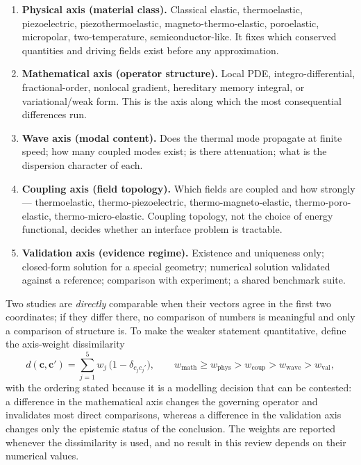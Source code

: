 \begin{enumerate}[label=\textbf{Axis \arabic*:}]
\item \textbf{Physical axis (material class).} Classical elastic, thermoelastic, piezoelectric,
  piezothermoelastic, magneto-thermo-elastic, poroelastic, micropolar, two-temperature, semiconductor-like.
  It fixes which conserved quantities and driving fields exist before any approximation.
\item \textbf{Mathematical axis (operator structure).} Local PDE, integro-differential, fractional-order,
  nonlocal gradient, hereditary memory integral, or variational/weak form. This is the axis along which the
  most consequential differences run.
\item \textbf{Wave axis (modal content).} Does the thermal mode propagate at finite speed; how many coupled
  modes exist; is there attenuation; what is the dispersion character of each.
\item \textbf{Coupling axis (field topology).} Which fields are coupled and how strongly ---
  thermoelastic, thermo-piezoelectric, thermo-magneto-elastic, thermo-poro-elastic, thermo-micro-elastic.
  Coupling topology, not the choice of energy functional, decides whether an interface problem is tractable.
\item \textbf{Validation axis (evidence regime).} Existence and uniqueness only; closed-form solution for a
  special geometry; numerical solution validated against a reference; comparison with experiment; a shared
  benchmark suite.
\end{enumerate}

Two studies are \emph{directly} comparable when their vectors agree in the first two coordinates; if they
differ there, no comparison of numbers is meaningful and only a comparison of structure is. To make the
weaker statement quantitative, define the axis-weight dissimilarity
\begin{equation}\label{eq:taxdissim}
d(\mathbf{c},\mathbf{c}')=\sum_{j=1}^{5} w_j\,\bigl(1-\delta_{c_j c_j'}\bigr),
\qquad
w_{\mathrm{math}}\ge w_{\mathrm{phys}}>w_{\mathrm{coup}}>w_{\mathrm{wave}}>w_{\mathrm{val}} ,
\end{equation}
with the ordering stated because it is a modelling decision that can be contested: a difference in the
mathematical axis changes the governing operator and invalidates most direct comparisons, whereas a
difference in the validation axis changes only the epistemic status of the conclusion. The weights are
reported whenever the dissimilarity is used, and no result in this review depends on their numerical values.


